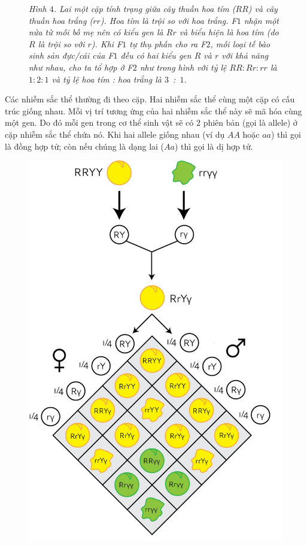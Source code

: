 \begin{multicols}{2}
\begin{figure}[H]
		\caption{\small\textit{\color{timhieukhoahoc}Hình $4$. Lai một cặp tính trạng giữa cây thuần hoa tím ($RR$) và cây thuần hoa trắng ($rr$). Hoa tím là trội so với hoa trắng. F$1$ nhận một nửa từ mỗi bố mẹ nên có kiểu gen là $Rr$ và biểu hiện là hoa tím (do $R$ là trội so với $r$). Khi F$1$ tự thụ phấn cho ra F$2$, mỗi loại tế bào sinh sản đực/cái của F$1$ đều có hai kiểu gen $R$ và $r$ với khả năng như nhau, cho ta tổ hợp ở F$2$ như trong hình với tỷ lệ $RR : Rr : rr$ là $1 : 2 :1$ và tỷ lệ hoa tím : hoa trắng là $3$~:~$1$.}}
		\vspace*{-5pt}
	\end{figure}
	Các nhiễm sắc thể thường đi theo cặp. Hai nhiễm sắc thể cùng một cặp có cấu trúc giống nhau. Mỗi vị trí tương ứng của hai nhiễm sắc thể này sẽ mã hóa cùng một gen. Do đó mỗi gen trong cơ thể sinh vật sẽ có $2$ phiên bản (gọi là allele) ở cặp nhiễm sắc thể chứa nó. Khi hai allele giống nhau (ví dụ $AA$ hoặc $aa$) thì gọi là đồng hợp tử; còn nếu chúng là dạng lai ($Aa$) thì gọi là dị hợp tử.
	\begin{figure}[H]
		\centering
		\vspace*{-5pt}
		\captionsetup{labelformat= empty, justification=centering}
		\includegraphics[width=0.88\linewidth]{image006}

\end{figure}
\end{multicols}
